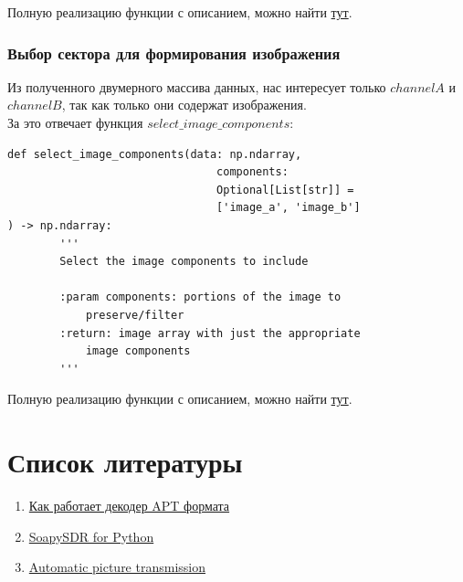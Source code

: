 \documentclass[a4paper, 14pt, titlepage, fleqn]{extarticle}
\begin{document}
	\noindent Полную реализацию функции с описанием, можно найти \href{https://github.com/kitfloppa/sdr-sat-receiving/blob/main/script_noaa_decoder.py#L101}{тут}. \\
	
	\pagebreak
	\subsubsection*{Выбор сектора для формирования изображения}
	
	Из полученного двумерного массива данных, нас интересует только $channel A$  и $channel B$, так как только они содержат изображения. \\
	
	\noindent За это отвечает функция $select\_image\_components$:
	
	\begin{verbatim}
def select_image_components(data: np.ndarray, 
                                components: 
                                Optional[List[str]] = 
                                ['image_a', 'image_b']
) -> np.ndarray:
        '''
        Select the image components to include

        :param components: portions of the image to 
        	preserve/filter
        :return: image array with just the appropriate 
        	image components
        '''
	\end{verbatim}
	
	\noindent Полную реализацию функции с описанием, можно найти \href{https://github.com/kitfloppa/sdr-sat-receiving/blob/main/script_noaa_decoder.py#L139}{тут}. \\
	
	\pagebreak
	\section*{Список литературы}
	
	\begin{enumerate}
		\item \href{https://noaa-apt.mbernardi.com.ar/how-it-works.html}{Как работает декодер APT формата}
		\item \href{https://github.com/pothosware/SoapySDR/wiki/PythonSupport}{SoapySDR for Python}
		\item \href{https://en.wikipedia.org/wiki/Automatic_picture_transmission}{Automatic picture transmission}
	\end{enumerate}
\end{document}
